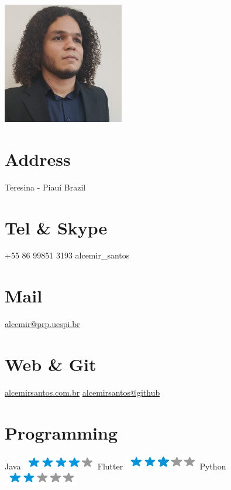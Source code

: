 \documentclass[nocolors]{friggeri-cv-a4}
\begin{document}


\begin{aside} %

\includegraphics[scale=0.5]{img/profile2.png}
~
 \section{Address}
 Teresina - Piau\'{i}
 Brazil
 ~
 \section{Tel \& Skype}
 +55 86  99851 3193
 alcemir\_santos
 ~
 \section{Mail}
 \href{mailto:alcemir@prp.uespi.br}{alcemir@prp.uespi.br}
 ~
 \section{Web \& Git}
 \href{https://www.alcemirsantos.com.br}{alcemirsantos.com.br}
 \href{https://github.com/alcemirsantos}{alcemirsantos@github}
~
 \section{Programming}
  Java \includegraphics[scale=0.40]{img/4stars.png}
  Flutter \includegraphics[scale=0.40]{img/3stars.png} 
  Python \includegraphics[scale=0.40]{img/2stars.png}
 ~

\end{aside}
\end{document}
